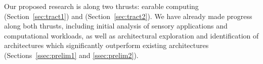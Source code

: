 Our proposed research is along two thrusts: earable computing (Section~\ref{sec:tract1})
and \olfc{} (Section~\ref{sec:tract2}).
We have already made progress along both thrusts, including initial analysis
of sensory applications and computational workloads, as well as architectural
exploration and identification of architectures which significantly outperform
existing architectures (Sections~\ref{ssec:prelim1} and \ref{ssec:prelim2}).
